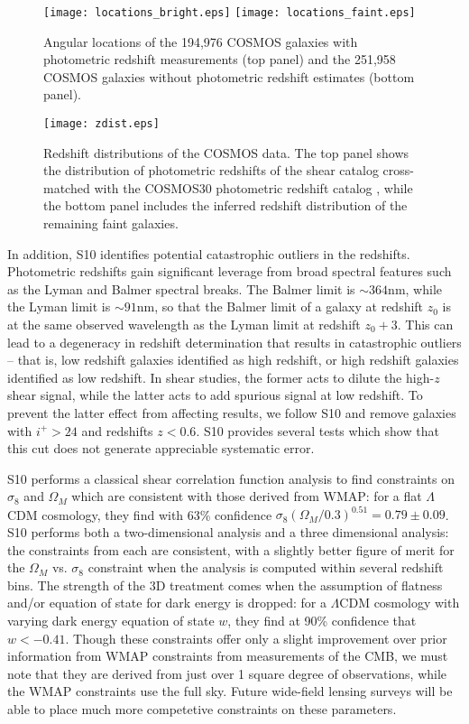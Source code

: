 \begin{figure}
  \centering
  \texttt{[image: locations\_bright.eps]}
  \texttt{[image: locations\_faint.eps]}
  \caption{Angular locations of the 194,976 COSMOS galaxies with photometric
    redshift measurements (top panel)
    and the 251,958 COSMOS galaxies without photometric redshift estimates
    (bottom panel).}
  \label{fig:COSMOS_locations}
\end{figure}

\begin{figure}
  \centering
  \texttt{[image: zdist.eps]}
  \caption{Redshift distributions of the COSMOS data.  The top panel shows the
    distribution of photometric redshifts of the shear catalog cross-matched
    with the COSMOS30 photometric redshift catalog \citep{Ilbert09}, while
    the bottom panel includes the inferred redshift distribution of the
    remaining faint galaxies.}
  \label{fig:COSMOS_zdist}
\end{figure}

In addition, S10 identifies potential catastrophic outliers in the redshifts.
Photometric redshifts gain significant leverage from broad spectral features
such as the Lyman and Balmer spectral breaks.  The Balmer limit is
$\sim 364$nm, while the Lyman limit is $\sim 91$nm, so that the Balmer limit
of a galaxy at redshift $z_0$ is at the same observed wavelength as the
Lyman limit at redshift $z_0 + 3$.  This can lead to a degeneracy in redshift
determination that results in catastrophic outliers -- that is, low redshift
galaxies identified as high redshift, or high redshift galaxies identified as
low redshift.  In shear studies, the former acts to dilute the high-$z$
shear signal,
while the latter acts to add spurious signal at low redshift.  To prevent
the latter effect from affecting results, we follow S10 and remove galaxies
with $i^+ > 24$ and redshifts $z < 0.6$.  S10 provides several tests which
show that this cut does not generate appreciable systematic error.

S10 performs a classical shear correlation function analysis to find
constraints on $\sigma_8$ and $\Omega_M$ which are consistent with
those derived from WMAP: for a flat $\Lambda$CDM cosmology, they
find with 63\% confidence 
$\sigma_8(\Omega_M / 0.3)^{0.51} = 0.79 \pm 0.09$.  S10 performs both a
two-dimensional analysis and a three dimensional analysis: the constraints
from each are consistent, with a slightly better figure of merit for the
$\Omega_M$ vs. $\sigma_8$ constraint when the analysis is computed within
several redshift bins.  The strength of the
3D treatment comes when the assumption of flatness and/or equation of
state for dark energy is dropped: for a
$\Lambda$CDM cosmology with varying dark energy equation of state $w$,
they find at 90\% confidence that $w < -0.41$.
Though these constraints offer only a slight improvement over prior
information from WMAP constraints from measurements of the CMB, we must
note that they are derived from just over
1 square degree of observations, while the
WMAP constraints use the full sky.  Future wide-field
lensing surveys will be able to place much more competetive constraints
on these parameters.

